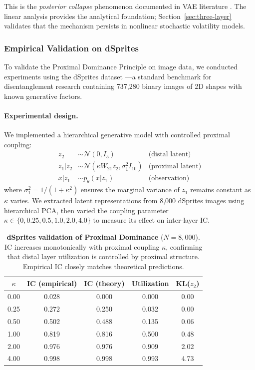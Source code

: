 \documentclass[10pt]{article} %
\theoremstyle{plain}
\theoremstyle{definition}
\begin{document}
\noindent This is the \emph{posterior collapse} phenomenon documented in VAE literature \citep{bowman2016generating, he2019lagging}. The linear analysis provides the analytical foundation; Section~\ref{sec:three-layer} validates that the mechanism persists in nonlinear stochastic volatility models.

\subsubsection{Empirical Validation on dSprites}
\label{sec:dsprites}

To validate the Proximal Dominance Principle on image data, we conducted experiments using the dSprites dataset \citep{dsprites17}---a standard benchmark for disentanglement research containing 737,280 binary images of 2D shapes with known generative factors.

\paragraph{Experimental design.} We implemented a hierarchical generative model with controlled proximal coupling:
\begin{align}
z_2 &\sim \mathcal{N}(0, I_5) & \text{(distal latent)} \\
z_1 | z_2 &\sim \mathcal{N}(\kappa W_{21} z_2, \sigma_1^2 I_{10}) & \text{(proximal latent)} \\
x | z_1 &\sim p_\theta(x | z_1) & \text{(observation)}
\end{align}
where $\sigma_1^2 = 1/(1+\kappa^2)$ ensures the marginal variance of $z_1$ remains constant as $\kappa$ varies. We extracted latent representations from 8,000 dSprites images using hierarchical PCA, then varied the coupling parameter $\kappa \in \{0, 0.25, 0.5, 1.0, 2.0, 4.0\}$ to measure its effect on inter-layer IC.

\begin{table}[!htbp]
\centering
\caption{\textbf{dSprites validation of Proximal Dominance} ($N = 8{,}000$). IC increases monotonically with proximal coupling $\kappa$, confirming that distal layer utilization is controlled by proximal structure. Empirical IC closely matches theoretical predictions.}
\label{tab:dsprites}
\begin{tabular}{@{}ccccc@{}}
\toprule
$\kappa$ & IC (empirical) & IC (theory) & Utilization & KL($z_2$) \\
\midrule
0.00 & 0.028 & 0.000 & 0.000 & 0.00 \\
0.25 & 0.272 & 0.250 & 0.032 & 0.00 \\
0.50 & 0.502 & 0.488 & 0.135 & 0.06 \\
1.00 & 0.819 & 0.816 & 0.500 & 0.48 \\
2.00 & 0.976 & 0.976 & 0.909 & 2.02 \\
4.00 & 0.998 & 0.998 & 0.993 & 4.73 \\
\bottomrule
\end{tabular}
\end{table}
\end{document}
